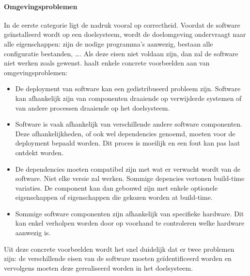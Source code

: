 \paragraph{Omgevingsproblemen}
In de eerste categorie ligt de nadruk vooral op correctheid.
Voordat de software geïnstalleerd wordt op een doelsysteem, wordt de doelomgeving ondervraagt naar alle eigenschappen: zijn de nodige programma's aanwezig, bestaan alle configuratie bestanden, \ldots .
Als deze eisen niet voldaan zijn, dan zal de software niet werken zoals gewenst.
\citet{dolstra2006purely} haalt enkele concrete voorbeelden aan van omgevingsproblemen:
\begin{itemize}
\item De deployment van software kan een gedistribueerd probleem zijn.
Software kan afhankelijk zijn van componenten draaiende op verwijderde systemen of van andere processen draaiende op het doelsysteem.  
\item Software is vaak afhankelijk van verschillende andere software componenten. 
Deze afhankelijkheden, of ook wel dependencies genoemd, moeten voor de deployment bepaald worden.
Dit proces is moeilijk en een fout kan pas laat ontdekt worden.
\item De dependencies moeten compatibel zijn met wat er verwacht wordt van de software.
Niet elke versie zal werken.
Sommige depencies vertonen build-time variaties.
De component kan dan gebouwd zijn met enkele optionele eigenschappen of eigenschappen die gekozen worden at build-time.
\item Sommige software componenten zijn afhankelijk van specifieke hardware.
Dit kan enkel verholpen worden door op voorhand te controleren welke hardware aanwezig is.
\end{itemize}
Uit deze concrete voorbeelden wordt het snel duidelijk dat er twee problemen zijn: de verschillende eisen van de software moeten geïdentificeerd worden en vervolgens moeten deze gerealiseerd worden in het doelsysteem.


